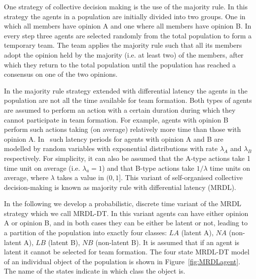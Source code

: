 \documentclass{elsarticle}
\begin{document}
One strategy of collective decision making is the use of the majority rule. In this strategy the agents in a population are initially divided into two groups. One in which all members have opinion A and one where all members have opinion B. In every step three agents are selected randomly from the total population to form a temporary team. The team applies the majority rule such that all its members adopt the opinion held by the majority (i.e. at least two) of the members, after which they return to the total population until the population has reached a consensus on one of the two opinions. 

In the majority rule strategy extended with differential latency the agents in the population are not all the time available for team formation. Both types of agents are assumed to perform an action with a certain duration during which they cannot participate in team formation. For example, agents with opinion B perform such actions taking (on average) relatively more time than those with opinion A. In~\cite{Mo+11} such latency periods for agents with opinion A and B are modelled by random variables with exponential distributions with rate $\lambda_A$ and $\lambda_B$ respectively.  For simplicity, it can also be assumed that the A-type actions take 1 time unit on average (i.e. $\lambda_a=1$) and that B-type actions take $1/\lambda$ time units on average, where $\lambda$ takes a value in $(0,1]$. This variant of self-organised collective decision-making is known as majority rule with differential latency (MRDL).

In the following we develop a probabilistic, discrete time variant of the MRDL strategy which we call MRDL-DT. In this variant agents can have either opinion A or opinion B, and in both cases they can be either be latent or not, leading to a partition of the population into exactly four classes: $\mathit{LA}$ (latent A), $\mathit{NA}$ (non-latent A), $\mathit{LB}$ (latent B), $\mathit{NB}$ (non-latent B). It is assumed that if an agent is latent it cannot be selected for team formation. The four state MRDL-DT model of an individual object of the population is shown in Figure~\ref{fig:MRDLagent}. The name of the states indicate in which class the object is.
\end{document}
